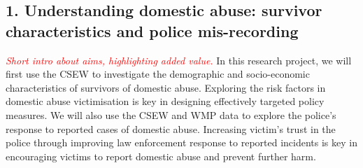 \documentclass[11pt, a4paper]{article}
\begin{document}
\subsection*{1. Understanding domestic abuse: survivor characteristics and police mis-recording}

 \textcolor{red}{\textit{Short intro about aims, highlighting added value.}}
In this research project, we will first use the CSEW to investigate the demographic and socio-economic characteristics of survivors of domestic abuse. Exploring the risk factors in domestic abuse victimisation is key in designing effectively targeted policy measures. We will also use the CSEW and WMP data to explore the police's response to reported cases of domestic abuse. Increasing victim's trust in the police through improving law enforcement response to reported incidents is key in encouraging victims to report domestic abuse and prevent further harm.



\end{document}
